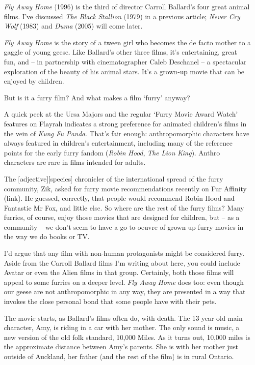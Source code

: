 \textit{Fly Away Home} (1996) is the third of director Carroll Ballard's four great animal films. I've discussed \textit{The Black Stallion} (1979) in a previous article; \textit{Never Cry Wolf} (1983) and \textit{Duma} (2005) will come later.

\textit{Fly Away Home} is the story of a tween girl who becomes the de facto mother to a gaggle of young geese. Like Ballard's other three films, it's entertaining, great fun, and -- in partnership with cinematographer Caleb Deschanel -- a spectacular exploration of the beauty of his animal stars. It's a grown-up movie that can be enjoyed by children.

But is it a furry film? And what makes a film `furry' anyway?

A quick peek at the Ursa Majors and the regular `Furry Movie Award Watch' features on Flayrah indicates a strong preference for animated children's films in the vein of \textit{Kung Fu Panda}. That's fair enough: anthropomorphic characters have always featured in children's entertainment, including many of the reference points for the early furry fandom (\textit{Robin Hood}, \textit{The Lion King}). Anthro characters are rare in films intended for adults.

The [adjective][species] chronicler of the international spread of the furry community, Zik, asked for furry movie recommendations recently on Fur Affinity (link). He guessed, correctly, that people would recommend Robin Hood and Fantastic Mr Fox, and little else. So where are the rest of the furry films? Many furries, of course, enjoy those movies that are designed for children, but -- as a community -- we don't seem to have a go-to oeuvre of grown-up furry movies in the way we do books or TV.

I'd argue that any film with non-human protagonists might be considered furry. Aside from the Carroll Ballard films I'm writing about here, you could include Avatar or even the Alien films in that group. Certainly, both those films will appeal to some furries on a deeper level. \textit{Fly Away Home} does too: even though our geese are not anthropomorphic in any way, they are presented in a way that invokes the close personal bond that some people have with their pets.

The movie starts, as Ballard's films often do, with death. The 13-year-old main character, Amy, is riding in a car with her mother. The only sound is music, a new version of the old folk standard, 10,000 Miles. As it turns out, 10,000 miles is the approximate distance between Amy's parents. She is with her mother just outside of Auckland, her father (and the rest of the film) is in rural Ontario.

